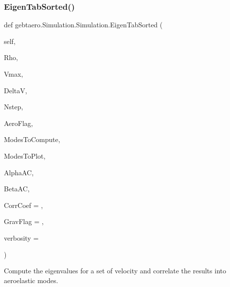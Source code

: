 \subsubsection{\texorpdfstring{Eigen\+Tab\+Sorted()}{EigenTabSorted()}}
{\footnotesize\ttfamily def gebtaero.\+Simulation.\+Simulation.\+Eigen\+Tab\+Sorted (\begin{DoxyParamCaption}\item[{}]{self,  }\item[{}]{Rho,  }\item[{}]{Vmax,  }\item[{}]{DeltaV,  }\item[{}]{Nstep,  }\item[{}]{Aero\+Flag,  }\item[{}]{Modes\+To\+Compute,  }\item[{}]{Modes\+To\+Plot,  }\item[{}]{Alpha\+AC,  }\item[{}]{Beta\+AC,  }\item[{}]{Corr\+Coef = {},  }\item[{}]{Grav\+Flag = {},  }\item[{}]{verbosity = {} }\end{DoxyParamCaption})}



Compute the eigenvalues for a set of velocity and correlate the results into aeroelastic modes. 


